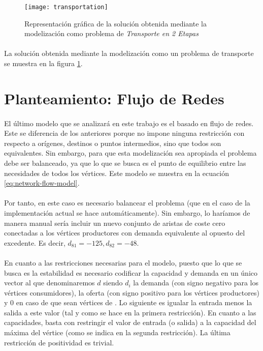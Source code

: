 \documentclass{article}
\begin{document}
    \begin{figure}[!hp]
      \centering
      \texttt{[image: transportation]}
      \caption{Representación gráfica de la solución obtenida mediante la modelización como problema de \emph{Transporte en 2 Etapas}}
      \label{img:graph-transportation}
    \end{figure}

    \paragraph{}
    La solución obtenida mediante la modelización como un problema de transporte se muestra en la figura \ref{img:graph-transportation}.


  \section{Planteamiento: Flujo de Redes}
  \label{section:network-flow}

    \paragraph{}
    El último modelo que se analizará en este trabajo es el basado en  flujo de redes. Este se diferencia de los anteriores porque no impone ninguna restricción con respecto a orígenes, destinos o puntos intermedios, sino que todos son equivalentes. Sin embargo, para que esta modelización sea apropiada el problema debe ser balanceado, ya que lo que se busca es el punto de equilibrio entre las necesidades de todos los vértices.  Este modelo se muestra en la ecuación \eqref{eq:network-flow-model}.

    \paragraph{}
    Por tanto, en este caso es necesario balancear el problema (que en el caso de la implementación actual se hace automáticamente). Sin embargo, lo haríamos de manera manual sería incluir un nuevo conjunto de aristas de coste cero conectadas a los vértices productores con demanda equivalente al opuesto del excedente. Es decir, $d_{81} = -125, d_{82} = -48$.

    \paragraph{}
    En cuanto a las restricciones necesarias para el modelo, puesto que lo que se busca es la estabilidad es necesario codificar la capacidad y demanda en un único vector al que denominaremos $d$ siendo $d_{i}$ la demanda (con signo negativo para los vértices consumidores), la oferta (con signo positivo para los vértices productores) y 0 en caso de que sean vértices de . Lo siguiente es igualar la entrada menos la salida a este valor (tal y como se hace en la primera restricción). En cuanto a las capacidades, basta con restringir el valor de entrada (o salida) a la capacidad del máxima del vértice (como se indica en la segunda restricción). La última restricción de positividad es trivial.
\end{document}
